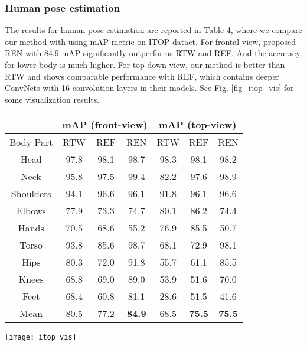 \documentclass[10pt,twocolumn,letterpaper]{article}
\begin{document}
\subsubsection{Human pose estimation}
The results for human pose estimation are reported in Table 4, where we compare our method with \cite{yub2015random} \cite{carreira2016human} using mAP metric on ITOP dataet. For frontal view, proposed REN with 84.9 mAP significantly outperforms RTW and REF. And the accuracy for lower body is much higher. For top-down view, our method is better than RTW and shows comparable performance with REF, which contains deeper ConvNets with 16 convolution layers in their models. See Fig. \ref{fig_itop_vis} for some visualization results.
\begin{table*}[htb]
\label{table_human}
\caption{Mean average precision (mAP, unit: \%) of different methods on frontal view and top view of ITOP dataset \cite{haque2016towards} using a 10cm threshold. Higher is better.}
\centering
\begin{tabular}{|c|c|c|c|c|c|c|}
\hline
& \multicolumn{3}{|c|}{mAP (front-view)} & \multicolumn{3}{|c|}{mAP (top-view)} \\
\hline
Body Part & RTW \cite{yub2015random} & REF \cite{carreira2016human} & REN & RTW \cite{yub2015random} & REF \cite{carreira2016human} & REN \\
\hline
Head & 97.8 & 98.1 & 98.7 & 98.3 & 98.1 & 98.2 \\
Neck & 95.8 & 97.5 & 99.4 & 82.2 & 97.6 & 98.9 \\
Shoulders & 94.1 & 96.6 & 96.1 & 91.8 & 96.1 & 96.6 \\
Elbows & 77.9 & 73.3 & 74.7 & 80.1 & 86.2 & 74.4 \\
Hands & 70.5 & 68.6 & 55.2 & 76.9 & 85.5 & 50.7 \\
Torso & 93.8 & 85.6 & 98.7 & 68.1 & 72.9 & 98.1 \\
Hips & 80.3 & 72.0 & 91.8 & 55.7 & 61.1 & 85.5 \\
Knees & 68.8 & 69.0 & 89.0 & 53.9 & 51.6 & 70.0 \\
Feet & 68.4 & 60.8 & 81.1 & 28.6 & 51.5 & 41.6 \\
\hline
Mean & 80.5 & 77.2 & \textbf{84.9} & 68.5 & \textbf{75.5} & \textbf{75.5} \\
\hline
\end{tabular}
\end{table*}

\begin{figure*}[htb]
\centering
{\texttt{[image: itop\_vis]}}
\caption{Example results on ITOP \cite{carreira2016human} dataset.}
\label{fig_itop_vis}
\end{figure*}
\end{document}
